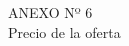 \begin{center}
    \vspace*{\fill} %
    \Huge %
    ANEXO Nº 6 \\
    Precio de la oferta
    \vspace*{\fill} %
\end{center}